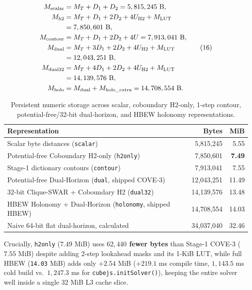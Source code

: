 \documentclass[10pt,twocolumn,letterpaper]{article}
\begin{document}
\[
\begin{aligned}
M_{\rm scalar} &= M_T + D_1 + D_2 = 5,815,245\ \text{B},\\
M_{\rm h2} &= M_T + D_1 + 2D_2 + 4U_{\rm H2} + M_{\rm LUT}\\
&= 7,850,601\ \text{B},\\
M_{\rm contour} &= M_T + D_1 + 2D_2 + 4U = 7,913,041\ \text{B},\\
M_{\rm dual} &= M_T + 3D_1 + 2D_2 + 4U_{\rm H2} + M_{\rm LUT}\\
&= 12,043,251\ \text{B},\\
M_{\rm dual32} &= M_T + 4D_1 + 2D_2 + 4U_{\rm H2} + M_{\rm LUT}\\
&= 14,139,576\ \text{B},\\
M_{\rm holo} &= M_{\rm dual} + M_{\rm holo\_extra} = 14,708,554\ \text{B}.
\end{aligned}
\tag{16}
\]

\begin{table}[H]
\caption{Persistent numeric storage across scalar, coboundary H2-only, 1-step contour, potential-free/32-bit dual-horizon, and HBEW holonomy representations.}
\centering\small
\begin{tabularx}{\columnwidth}{@{}Lrr@{}}
\toprule
Representation & Bytes & MiB \\
\midrule
Scalar byte distances (\texttt{scalar}) & 5,815,245 & 5.55 \\
Potential-free Coboundary H2-only (\texttt{h2only}) & 7,850,601 & \textbf{7.49} \\
Stage-1 dictionary contours (\texttt{contour}) & 7,913,041 & 7.55 \\
Potential-free Dual-Horizon (\texttt{dual}, shipped COVE-3) & 12,043,251 & 11.49 \\
32-bit Clique-SWAR + Coboundary H2 (\texttt{dual32}) & 14,139,576 & 13.48 \\
HBEW Holonomy + Dual-Horizon (\texttt{holonomy}, shipped HBEW) & 14,708,554 & 14.03 \\
Naive 64-bit flat dual-horizon, calculated & 34,037,040 & 32.46 \\
\bottomrule
\end{tabularx}
\end{table}

Crucially, \texttt{h2only} (\(7.49\) MiB) uses \textbf{\(62,440\) fewer
bytes} than Stage-1 COVE-3 (\(7.55\) MiB) despite adding 2-step
lookahead masks and its 1-KiB LUT, while full HBEW (\texttt{14.03} MiB)
adds only \(+2.54\) MiB (\(+219.1\) ms compile time, \(1,143.5\) ms cold
build vs.~\(1,247.3\) ms for \texttt{cubejs.initSolver()}), keeping the
entire solver well inside a single 32 MiB L3 cache slice.
\end{document}
